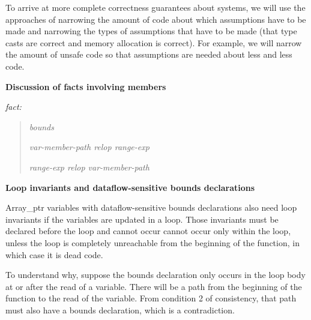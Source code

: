 \documentclass[]{article}
\begin{document}
To arrive at more complete correctness guarantees about systems, we will
use the approaches of narrowing the amount of code about which
assumptions have to be made and narrowing the types of assumptions that
have to be made (that type casts are correct and memory allocation is
correct). For example, we will narrow the amount of unsafe code so that
assumptions are needed about less and less code.

\textbf{Discussion of facts involving members}

\emph{fact: }

\begin{quote}
\emph{bounds}

\emph{var-member-path relop range-exp}

\emph{range-exp relop var-member-path}
\end{quote}

\textbf{Loop invariants and dataflow-sensitive bounds declarations}

Array\_ptr variables with dataflow-sensitive bounds declarations also
need loop invariants if the variables are updated in a loop. Those
invariants must be declared before the loop and cannot occur cannot
occur only within the loop, unless the loop is completely unreachable
from the beginning of the function, in which case it is dead code.

To understand why, suppose the bounds declaration only occurs in the
loop body at or after the read of a variable. There will be a path from
the beginning of the function to the read of the variable. From
condition 2 of consistency, that path must also have a bounds
declaration, which is a contradiction.
\end{document}
